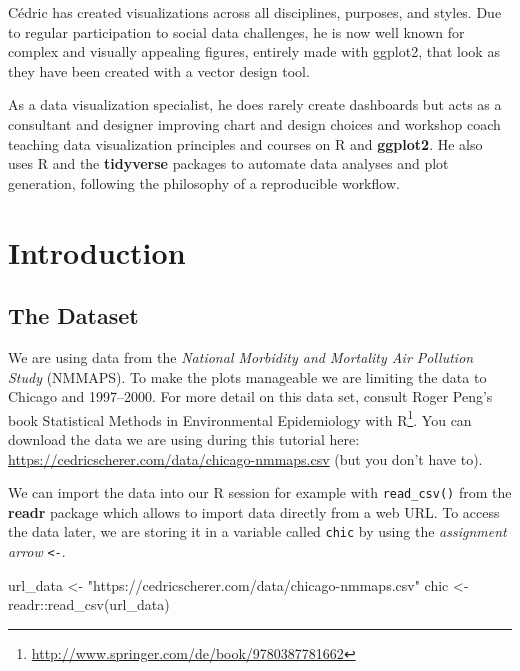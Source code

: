 \documentclass[
]{krantz}
\makeatletter
\newenvironment{Shaded}{\begin{snugshade}}{\end{snugshade}}
\newcommand{\FunctionTok}[1]{\textcolor[rgb]{0,0,0}{#1}}
\newcommand{\NormalTok}[1]{#1}
\newcommand{\OtherTok}[1]{\textcolor[rgb]{0.37,0.37,0.37}{#1}}
\newcommand{\SpecialCharTok}[1]{\textcolor[rgb]{0,0,0}{#1}}
\newcommand{\StringTok}[1]{\textcolor[rgb]{0.5,0.5,0.5}{#1}}
\renewcommand{\href}[2]{#2\footnote{\url{#1}}}
\newenvironment{kframe}{%
\medskip{}
\setlength{\fboxsep}{.8em}
 \def\at@end@of@kframe{}%
 \ifinner\ifhmode%
  \def\at@end@of@kframe{\end{minipage}}%
  \begin{minipage}{\columnwidth}%
 \fi\fi%
 \def\FrameCommand##1{\hskip\@totalleftmargin \hskip-\fboxsep
 \colorbox{shadecolor}{##1}\hskip-\fboxsep
     \hskip-\linewidth \hskip-\@totalleftmargin \hskip\columnwidth}%
 \MakeFramed {\advance\hsize-\width
   \@totalleftmargin\z@ \linewidth\hsize
   \@setminipage}}%
 {\par\unskip\endMakeFramed%
 \at@end@of@kframe}
\renewenvironment{Shaded}{\begin{kframe}}{\end{kframe}}
\makeatother
\begin{document}
Cédric has created visualizations across all disciplines, purposes, and styles. Due to regular participation to social data challenges, he is now well known for complex and visually appealing figures, entirely made with ggplot2, that look as they have been created with a vector design tool.

As a data visualization specialist, he does rarely create dashboards but acts as a consultant and designer improving chart and design choices and workshop coach teaching data visualization principles and courses on R and \textbf{ggplot2}. He also uses R and the \textbf{tidyverse} packages to automate data analyses and plot generation, following the philosophy of a reproducible workflow.

\mainmatter

\hypertarget{introduction}{%
\chapter{Introduction}\label{introduction}}

\hypertarget{data}{%
\section{The Dataset}\label{data}}

We are using data from the \emph{National Morbidity and Mortality Air Pollution Study} (NMMAPS). To make the plots manageable we are limiting the data to Chicago and 1997--2000. For more detail on this data set, consult Roger Peng's book \href{http://www.springer.com/de/book/9780387781662}{Statistical Methods in Environmental Epidemiology with R}.
You can download the data we are using during this tutorial here: \url{https://cedricscherer.com/data/chicago-nmmaps.csv} (but you don't have to).

We can import the data into our R session for example with \texttt{read\_csv()} from the \textbf{readr} package which allows to import data directly from a web URL. To access the data later, we are storing it in a variable called \texttt{chic} by using the \emph{assignment arrow} \texttt{\textless{}-}.

\begin{Shaded}
\begin{Highlighting}[]
\NormalTok{url\_data }\OtherTok{\textless{}{-}} \StringTok{"https://cedricscherer.com/data/chicago{-}nmmaps.csv"}
\NormalTok{chic }\OtherTok{\textless{}{-}}\NormalTok{ readr}\SpecialCharTok{::}\FunctionTok{read\_csv}\NormalTok{(url\_data)}
\end{Highlighting}
\end{Shaded}
\end{document}
